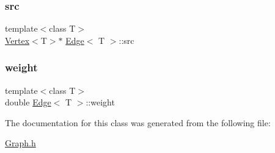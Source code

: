 \mbox{\label{class_edge_ac19036953f77507f329af34355aed4db}} 
\subsubsection{\texorpdfstring{src}{src}}
{\footnotesize\ttfamily template$<$class T$>$ \\
\hyperlink{class_vertex}{Vertex}$<$T$>$$\ast$ \hyperlink{class_edge}{Edge}$<$ T $>$\+::src\hspace{0.3cm}{\ttfamily [private]}}

\mbox{\label{class_edge_af188b57b604f0d65e2da48733bd76426}} 
\subsubsection{\texorpdfstring{weight}{weight}}
{\footnotesize\ttfamily template$<$class T$>$ \\
double \hyperlink{class_edge}{Edge}$<$ T $>$\+::weight\hspace{0.3cm}{\ttfamily [private]}}



The documentation for this class was generated from the following file\+:\begin{DoxyCompactItemize}
\item 
\hyperlink{_graph_8h}{Graph.\+h}\end{DoxyCompactItemize}
